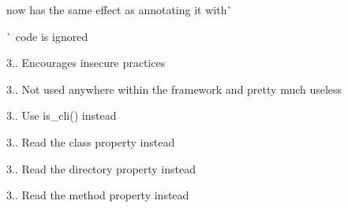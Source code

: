 
\begin{DoxyRefList}
\item[\label{deprecated__deprecated000024}%
\Hypertarget{deprecated__deprecated000024}%
Page \mbox{\hyperlink{md___applications__x_a_m_p_p_xamppfiles_htdocs__code_igniter_vendor_phpunit_php-code-coverage__change_log-2_82}{Changes in P\+H\+P\+\_\+\+Code\+Coverage 2.2}} ]{\ttfamily now has the same effect as annotating it with}\`{} 
\item[\label{deprecated__deprecated000025}%
\Hypertarget{deprecated__deprecated000025}%
Page \mbox{\hyperlink{md___applications__x_a_m_p_p_xamppfiles_htdocs__code_igniter_vendor_phpunit_php-code-coverage__change_log-3_80}{Changes in P\+H\+P\+\_\+\+Code\+Coverage 3.0}} ]\`{} code is ignored 
\item[\label{deprecated__deprecated000001}%
\Hypertarget{deprecated__deprecated000001}%
Global \mbox{\hyperlink{class_c_i___config_a71e857f8dd38c230f1ce11bacf177ba8}{C\+I\+\_\+\+Config\+:\+:system\+\_\+url}} ()]3.. Encourages insecure practices  
\item[\label{deprecated__deprecated000019}%
\Hypertarget{deprecated__deprecated000019}%
Global \mbox{\hyperlink{class_c_i___form__validation_a53938e0a994c9995de5c979ecb27bf1d}{C\+I\+\_\+\+Form\+\_\+validation\+:\+:prep\+\_\+for\+\_\+form}} (\$data)]3.. Not used anywhere within the framework and pretty much useless  
\item[\label{deprecated__deprecated000002}%
\Hypertarget{deprecated__deprecated000002}%
Global \mbox{\hyperlink{class_c_i___input_a70c1e8a081ef955c1a52164634d4f66e}{C\+I\+\_\+\+Input\+:\+:is\+\_\+cli\+\_\+request}} ()]3.. Use is\+\_\+cli() instead  
\item[\label{deprecated__deprecated000003}%
\Hypertarget{deprecated__deprecated000003}%
Global \mbox{\hyperlink{class_c_i___router_af5586c3f514021e9e2588e102620d237}{C\+I\+\_\+\+Router\+:\+:fetch\+\_\+class}} ()]3.. Read the \textquotesingle{}class\textquotesingle{} property instead  
\item[\label{deprecated__deprecated000005}%
\Hypertarget{deprecated__deprecated000005}%
Global \mbox{\hyperlink{class_c_i___router_a7a089f2cfae731dcc9e59a71d20208ef}{C\+I\+\_\+\+Router\+:\+:fetch\+\_\+directory}} ()]3.. Read the \textquotesingle{}directory\textquotesingle{} property instead  
\item[\label{deprecated__deprecated000004}%
\Hypertarget{deprecated__deprecated000004}%
Global \mbox{\hyperlink{class_c_i___router_ad408b28e3a095e7435f21e95d93e7714}{C\+I\+\_\+\+Router\+:\+:fetch\+\_\+method}} ()]3.. Read the \textquotesingle{}method\textquotesingle{} property instead  

\end{DoxyRefList}
